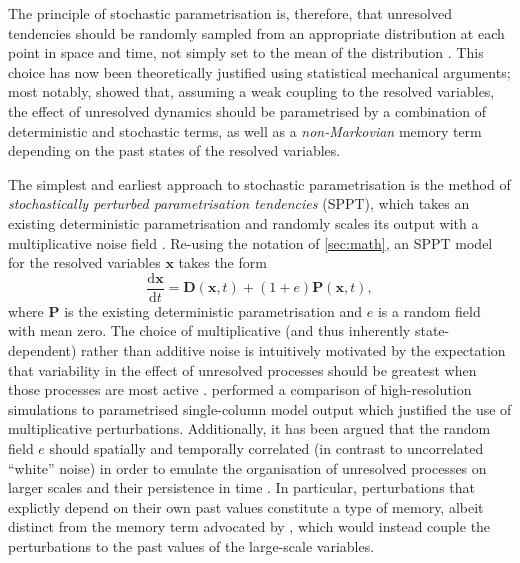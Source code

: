 \documentclass[titlepage,twoside]{article}
\numberwithin{equation}{section}
\newcommand{\diff}[2]{\frac{\mathrm{d} #1}{\mathrm{d} #2}}
\renewcommand\vec{\bm}
\begin{document}
The principle of stochastic parametrisation is, therefore, that unresolved
tendencies should be randomly sampled from an appropriate distribution at each
point in space and time, not simply set to the mean of the distribution
\parencite{franzke2015}. This choice has now been theoretically justified using
statistical mechanical arguments; most notably,
\textcite{wouters2012,wouters2013} showed that, assuming a weak coupling to the
resolved variables, the effect of unresolved dynamics should be parametrised by
a combination of deterministic and stochastic terms, as well as a
\emph{non-Markovian} memory term depending on the past states of the resolved
variables.

The simplest and earliest approach to stochastic parametrisation is the method
of \emph{stochastically perturbed parametrisation tendencies} (SPPT), which
takes an existing deterministic parametrisation and randomly scales its output
with a multiplicative noise field \parencite{palmer2019,christensen2020}.
Re-using the notation of \cref{sec:math}, an SPPT model for the resolved
variables $\vec{x}$ takes the form
\begin{equation*}
    \diff{\vec{x}}{t} = \vec{D}(\vec{x},t) + (1 + e) \vec{P}(\vec{x}, t),
\end{equation*}
where $\vec{P}$ is the existing deterministic parametrisation and $e$ is a
random field with mean zero. The choice of multiplicative (and thus inherently
state-dependent) rather than additive noise is intuitively motivated by the
expectation that variability in the effect of unresolved processes should be
greatest when those processes are most active \parencite{franzke2015}.
\textcite{christensen2020} performed a comparison of high-resolution
simulations to parametrised single-column model output which justified the use
of multiplicative perturbations. Additionally, it has been argued that the
random field $e$ should spatially and temporally correlated (in contrast to
uncorrelated ``white'' noise) in order to emulate the organisation of
unresolved processes on larger scales and their persistence in time
\parencite{christensen2022,franzke2015}. In particular, perturbations that
explictly depend on their own past values constitute a type of memory, albeit
distinct from the memory term advocated by \textcite{wouters2012,wouters2013},
which would instead couple the perturbations to the past values of the
large-scale variables.
\end{document}
